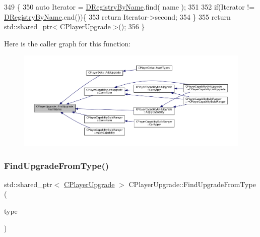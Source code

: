 \begin{DoxyCode}
349                                                                                         \{
350     \textcolor{keyword}{auto} Iterator = \hyperlink{classCPlayerUpgrade_a33e022bd67ce2f4d9ce83dfd0b7289f6}{DRegistryByName}.find( name );
351     
352     \textcolor{keywordflow}{if}(Iterator != \hyperlink{classCPlayerUpgrade_a33e022bd67ce2f4d9ce83dfd0b7289f6}{DRegistryByName}.end())\{
353         \textcolor{keywordflow}{return} Iterator->second;    
354     \}
355     \textcolor{keywordflow}{return} std::shared\_ptr< CPlayerUpgrade >();
356 \}
\end{DoxyCode}
Here is the caller graph for this function\+:\nopagebreak
\begin{figure}[H]
\begin{center}
\leavevmode
\includegraphics[width=350pt]{classCPlayerUpgrade_af47a08aba3a1a5b2cefacef24065a82e_icgraph}
\end{center}
\end{figure}
\hypertarget{classCPlayerUpgrade_a05c0124e952cc3f52108bdf6d2b76192}{}\label{classCPlayerUpgrade_a05c0124e952cc3f52108bdf6d2b76192} 
\subsubsection{\texorpdfstring{Find\+Upgrade\+From\+Type()}{FindUpgradeFromType()}}
{\footnotesize\ttfamily std\+::shared\+\_\+ptr$<$ \hyperlink{classCPlayerUpgrade}{C\+Player\+Upgrade} $>$ C\+Player\+Upgrade\+::\+Find\+Upgrade\+From\+Type (\begin{DoxyParamCaption}\item[{\hyperlink{GameDataTypes_8h_a35b98ce26aca678b03c6f9f76e4778ce}{E\+Asset\+Capability\+Type}}]{type }\end{DoxyParamCaption})\hspace{0.3cm}{\ttfamily [static]}}



